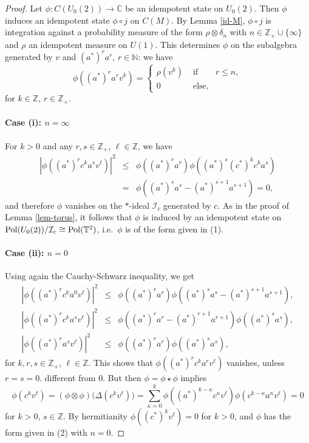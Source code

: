 \documentclass[12pt]{amsart}
\theoremstyle{definition}
\theoremstyle{remark}
\numberwithin{equation}{section}
\begin{document}
\begin{proof} 
Let $\phi:C(U_0(2))\to\mathbb{C}$ be an idempotent state on $U_0(2)$. Then
$\phi$ induces an idempotent state $\phi\circ j$ on $C(M)$. By Lemma
\ref{id-M}, $\phi\circ j$ is integration against a probability measure of the form $\rho\otimes \delta_{n}$ with
$n\in\mathbb{Z}_+\cup\{\infty\}$ and $\rho$ an idempotent measure on
$U(1)$. This determines $\phi$ on the subalgebra generated by $v$ and
$(a^*)^ra^r$, $r\in\mathbb{N}$: we have
\[
\phi\left((a^*)^ra^rv^k\right)=
\left\{
\begin{array}{lcl}
\rho(v^k) & \mbox{ if } & r\le n, \\
0 & \mbox{ else,}&
\end{array}
\right.
\]
for $k\in\mathbb{Z}$, $r\in\mathbb{Z}_+$.

\paragraph{Case (i): $n=\infty$}
For $k>0$ and any $r,s\in\mathbb{Z}_+$, $\ell\in\mathbb{Z}$, we have
\begin{eqnarray*}
\left|\phi\left((a^*)^r c^k a^s v^\ell\right)\right|^2 &\le&
\phi\left((a^*)^ra^r\right)\phi\left((a^*)^s (c^*)^kc^k a^s\right) \\
&=& \phi\left((a^*)^s a^s-(a^*)^{s+1} a^{s+1}\right) =0,
\end{eqnarray*}
and therefore $\phi$ vanishes on the $*$-ideal $\mathcal{I}_c$ generated by
$c$. As in the proof of Lemma \ref{lem-torus}, it follows that $\phi$ is
induced by an idempotent state on ${\rm Pol}(U_0(2))/\mathcal{I}_c\cong {\rm
  Pol}(\mathbb{T}^2)$, i.e.\ $\phi$ is of the form given in (1).
\paragraph{Case (ii): $n=0$}
Using again the Cauchy-Schwarz inequality, we get
\begin{eqnarray}
\left|\phi\left((a^*)^r c^k a^0 v^\ell\right)\right|^2 &\le&
\phi\left((a^*)^ra^r\right)\phi\left((a^*)^s a^s-(a^*)^{s+1}
  a^{s+1}\right),
\label{ineq-1} \\
\left|\phi\left((a^*)^r c^k a^s v^\ell\right)\right|^2 &\le& \phi\left((a^*)^r a^r-(a^*)^{r+1}a^{r+1}\right)\phi\left((a^*)^s a^s\right),
\label{ineq-2} \\
\left|\phi\left((a^*)^r a^s v^\ell\right)\right|^2 &\le&
\phi\left((a^*)^ra^r\right)\phi\left((a^*)^s a^s\right),
\label{ineq-3}
\end{eqnarray}
for $k,r,s\in\mathbb{Z}_+$, $\ell\in\mathbb{Z}$. This shows that
$\phi\left((a^*)^r c^k a^r v^\ell\right)$ vanishes, unless $r=s=0$.
different from $0$. But then $\phi=\phi\star\phi$ implies
\[
\phi(c^kv^\ell) = (\phi\otimes\phi)\big(\Delta(c^k v^\ell)\big) = \sum_{\kappa=0}^k \phi\left((a^*)^{k-\kappa}c^\kappa
  v^\ell\right)\phi\left(c^{k-\kappa}a^\kappa v^\ell\right) = 0
\]
for $k>0$, $s\in\mathbb{Z}$. By hermitianity
$\phi\left((c^*)^kv^\ell\right)=0$ for $k>0$, and $\phi$ has the form given in
(2) with $n=0$.

\end{proof}
\end{document}
